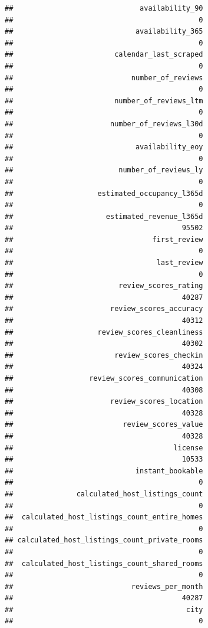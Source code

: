 \documentclass[
]{article}
\begin{document}
\begin{verbatim}
##                              availability_90 
##                                            0 
##                             availability_365 
##                                            0 
##                        calendar_last_scraped 
##                                            0 
##                            number_of_reviews 
##                                            0 
##                        number_of_reviews_ltm 
##                                            0 
##                       number_of_reviews_l30d 
##                                            0 
##                             availability_eoy 
##                                            0 
##                         number_of_reviews_ly 
##                                            0 
##                    estimated_occupancy_l365d 
##                                            0 
##                      estimated_revenue_l365d 
##                                        95502 
##                                 first_review 
##                                            0 
##                                  last_review 
##                                            0 
##                         review_scores_rating 
##                                        40287 
##                       review_scores_accuracy 
##                                        40312 
##                    review_scores_cleanliness 
##                                        40302 
##                        review_scores_checkin 
##                                        40324 
##                  review_scores_communication 
##                                        40308 
##                       review_scores_location 
##                                        40328 
##                          review_scores_value 
##                                        40328 
##                                      license 
##                                        10533 
##                             instant_bookable 
##                                            0 
##               calculated_host_listings_count 
##                                            0 
##  calculated_host_listings_count_entire_homes 
##                                            0 
## calculated_host_listings_count_private_rooms 
##                                            0 
##  calculated_host_listings_count_shared_rooms 
##                                            0 
##                            reviews_per_month 
##                                        40287 
##                                         city 
##                                            0
\end{verbatim}
\end{document}
